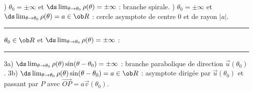 \Methode [Branche infinie en $\theta_0$ d'une courbe polaire {$\vec {OM}(\theta) = \rho(\theta)\vec u$}]
\PAR{}) $\theta_0=\pm\infty$ et $\ds\lim_{\theta\to\theta_0}\rho(\theta)=\pm\infty$ : branche spirale.
\PAR{}) $\theta_0=\pm\infty$ et $\ds\lim_{\theta\to\theta_0}\rho(\theta)=a\in\ob R$ : 
cercle asymptote de centre $0$ et de rayon $|a|$. 
\smallskip\noindent\hrule\smallskip
\centerline{$\theta_0\in\ob R$ et $\ds\lim_{\theta\to\theta_0}\rho(\theta)=\pm\infty$ :}
\PAR\noindent\hrule\smallskip\noindent
3a) $\ds\lim_{\theta\to\theta_0}\rho(\theta)\sin(\theta-\theta_0)=\pm\infty$ :  branche parabolique de direction $\vec u(\theta_0)$. 
\PAR\noindent
3b) $\ds\lim_{\theta\to\theta_0}\rho(\theta)\sin(\theta-\theta_0)=a\in\ob R$ : asymptote dirigée par $\vec u(\theta_0)$ et passant par $P$ avec $\vec{OP}=a\vec v(\theta_0)$. 





\bye